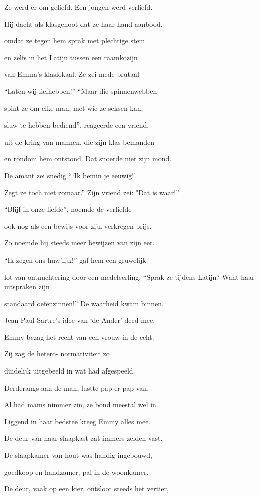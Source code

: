 Ze werd er om geliefd.
Een jongen werd verliefd.

Hij dacht als klasgenoot
dat ze haar hand aanbood,

omdat ze tegen hem
sprak met plechtige stem

en zelfs in het Latijn
tussen een raamkozijn

van Emma’s klaslokaal.
Ze zei mede brutaal

“Laten wij liefhebben!”
“Maar die spinnenwebben

spint ze om elke man,
met wie ze seksen kan,

sluw te hebben bediend”,
reageerde een vriend,

uit de kring van mannen,
die zijn klas bemanden

en rondom hem ontstond.
Dat snoerde niet zijn mond.

De amant zei snedig
“‘Ik bemin je eeuwig!’

Zegt ze toch niet zomaar.”
Zijn vriend zei: "Dat is waar!”

“Blijf in onze liefde”,
noemde de verliefde

ook nog als een bewijs
voor zijn verkregen prijs.

Zo noemde hij steeds meer
bewijzen van zijn eer.

“Ik zegen ons huw’lijk!”
gaf hem een gruwelijk

lot van ontnuchtering
door een medeleerling.
“Sprak ze tijdens Latijn?
Want haar uitspraken zijn

standaard oefenzinnen!”
De waarheid kwam binnen.

Jean-Paul Sartre's idee
van ‘de Ander’ deed mee.

Emmy bezag het recht
van een vrouw in de echt.

Zij zag de hetero-
normativiteit zo

duidelijk uitgebeeld
in wat had afgespeeld.

Derderangs aan de man,
lustte pap er pap van.

Al had mams nimmer zin,
ze bond meestal wel in.

Liggend in haar bedstee
kreeg Emmy alles mee.

De deur van haar slaapkast
zat immers zelden vast.

De slaapkamer van hout
was handig ingebouwd,

goedkoop en handzamer,
pal in de woonkamer.

De deur, vaak op een kier,
ontsloot steeds het vertier,

